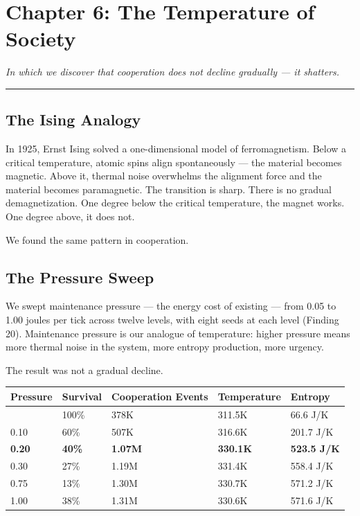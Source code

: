 \chapter{Chapter 6: The Temperature of Society}\label{chapter-6-the-temperature-of-society}

\emph{In which we discover that cooperation does not decline gradually --- it shatters.}

\begin{center}\rule{0.5\linewidth}{0.5pt}\end{center}

\section{The Ising Analogy}\label{the-ising-analogy}

In 1925, Ernst Ising solved a one-dimensional model of ferromagnetism. Below a critical temperature, atomic spins align spontaneously --- the material becomes magnetic. Above it, thermal noise overwhelms the alignment force and the material becomes paramagnetic. The transition is sharp. There is no gradual demagnetization. One degree below the critical temperature, the magnet works. One degree above, it does not.

We found the same pattern in cooperation.

\section{The Pressure Sweep}\label{the-pressure-sweep}

We swept maintenance pressure --- the energy cost of existing --- from 0.05 to 1.00 joules per tick across twelve levels, with eight seeds at each level (Finding 20). Maintenance pressure is our analogue of temperature: higher pressure means more thermal noise in the system, more entropy production, more urgency.

The result was not a gradual decline.

\begin{longtable}[]{@{}lllll@{}}
\toprule\noalign{}
Pressure & Survival & Cooperation Events & Temperature & Entropy \\
\midrule\noalign{}
\endhead
\bottomrule\noalign{}
\endlastfoot
0.05 & 100\% & 378K & 311.5K & 66.6 J/K \\
0.10 & 60\% & 507K & 316.6K & 201.7 J/K \\
\textbf{0.20} & \textbf{40\%} & \textbf{1.07M} & \textbf{330.1K} & \textbf{523.5 J/K} \\
0.30 & 27\% & 1.19M & 331.4K & 558.4 J/K \\
0.75 & 13\% & 1.30M & 330.7K & 571.2 J/K \\
1.00 & 38\% & 1.31M & 330.6K & 571.6 J/K \\
\end{longtable}

